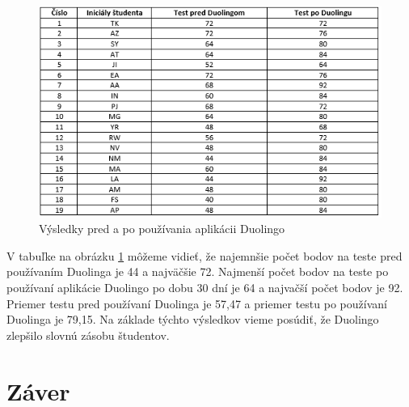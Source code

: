 \documentclass[10pt,oneside,slovak,a4paper]{article}
\begin{document}
\begin{figure}[h] %
\centering
\includegraphics{duo_studium.png}
\caption{Výsledky pred a po používania aplikácii Duolingo\cite{duolingo}}
\label{duo-studium}
\end{figure}

V tabuľke na obrázku \ref{duo-studium} môžeme vidieť, že najemnšie počet bodov na teste pred používaním Duolinga je 44 a najväčšie 72. Najmenší počet bodov na teste po používaní aplikácie  Duolingo po dobu 30 dní je 64 a najvačší počet bodov je 92. Priemer testu pred používaní Duolinga je 57,47 a priemer testu po používaní Duolinga je 79,15. Na základe týchto výsledkov vieme posúdiť, že Duolingo zlepšilo slovnú zásobu študentov.



\cite{duolingo}
\section{Záver}



\end{document}
